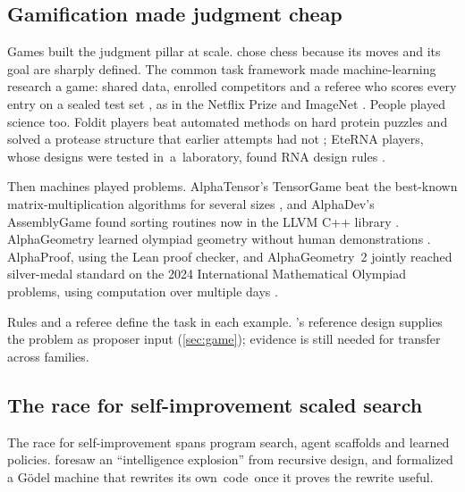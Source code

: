 \subsection{Gamification made judgment cheap}\label{sub:road-games}

Games built the judgment pillar at scale. \citet{shannon1950chess} chose
chess because its moves and its goal are sharply defined. The common task
framework made machine-learning research a game: shared data, enrolled
competitors and a referee who scores every entry on a sealed test set
\citep{donoho2017fifty}, as in the Netflix Prize \citep{bennett2007netflix}
and ImageNet \citep{russakovsky2015imagenet}. People played science too.
Foldit players beat automated methods on hard protein puzzles
\citep{cooper2010foldit} and solved a protease structure that earlier
attempts had not \citep{khatib2011protease}; EteRNA players, whose designs
were tested \mbox{in a laboratory,} found RNA design rules \citep{lee2014eterna}.

Then machines played problems. AlphaTensor's TensorGame beat the best-known
matrix-multiplication algorithms for several sizes
\citep{fawzi2022alphatensor}, and AlphaDev's AssemblyGame found sorting
routines now in the LLVM C++ library \citep{mankowitz2023alphadev}.
AlphaGeometry learned olympiad geometry without human demonstrations
\citep{trinh2024alphageometry}. AlphaProof, using the Lean proof
checker, and AlphaGeometry~2 jointly reached silver-medal standard on the
2024 International Mathematical Olympiad problems, using computation over
multiple days \citep{hubert2026alphaproof}.

Rules and a referee define the task in each example. \EZ{}'s reference
design supplies the problem as proposer input (\cref{sec:game}); evidence
is still needed for transfer across families.

\subsection{The race for self-improvement scaled search}\label{sub:road-self}

The race for self-improvement spans program search, agent scaffolds and learned policies.
\citet{good1966speculations} foresaw an ``intelligence explosion'' from recursive design, and
\citet{schmidhuber2003goedel} formalized a G\"odel machine that rewrites its
\mbox{own code once} it proves the rewrite useful.

